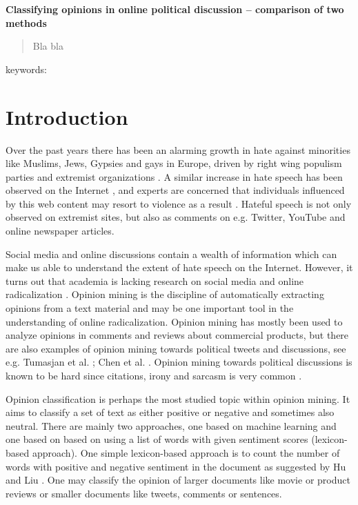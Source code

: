 \documentclass[11pt]{article}
\begin{document}
\begin{center}
  \textbf{\Large{Classifying opinions in online political discussion -- comparison of two methods}}

\vspace{5mm}

\end{center}

\begin{abstract}
Bla bla
\end{abstract}

keywords: \textit{}

\section{Introduction}
\label{sec:introduction}

Over the past years there has been an alarming growth in hate against minorities like Muslims, Jews, Gypsies and gays in Europe, driven by right wing populism parties and extremist organizations \cite{r4,r11}. A similar increase in hate speech has been observed on the Internet \cite{r6,s2}, and experts are concerned that individuals influenced by this web content may resort to violence as a result \cite{Strommen12,Sunde13}. Hateful speech is not only observed on extremist sites, but also as comments on e.g. Twitter, YouTube and online newspaper articles.  

Social media and online discussions contain a wealth of information which can make us able to understand the extent of hate speech on the Internet. However, it turns out that academia is lacking research on social media and online radicalization \cite{s1}. Opinion mining is the discipline of automatically extracting opinions from a text material and may be one important tool in the understanding of online radicalization. Opinion mining has mostly been used to analyze opinions in comments and reviews about commercial products, but there are also examples of opinion mining towards political tweets and discussions, see e.g. Tumasjan et al. ; Chen et al. . Opinion mining towards political discussions is known to be hard since citations, irony and sarcasm is very common \cite{Bing12}.

Opinion classification is perhaps the most studied topic within opinion mining. It aims to classify a set of text as either positive or negative and sometimes also neutral. There are mainly two approaches, one based on machine learning and one based on based on using a list of words with given sentiment scores (lexicon-based approach). One simple lexicon-based approach is to count the number of words with positive and negative sentiment in the document as suggested by Hu and Liu . One may classify the opinion of larger documents like movie or product reviews or smaller documents like tweets, comments or sentences. %
\end{document}
